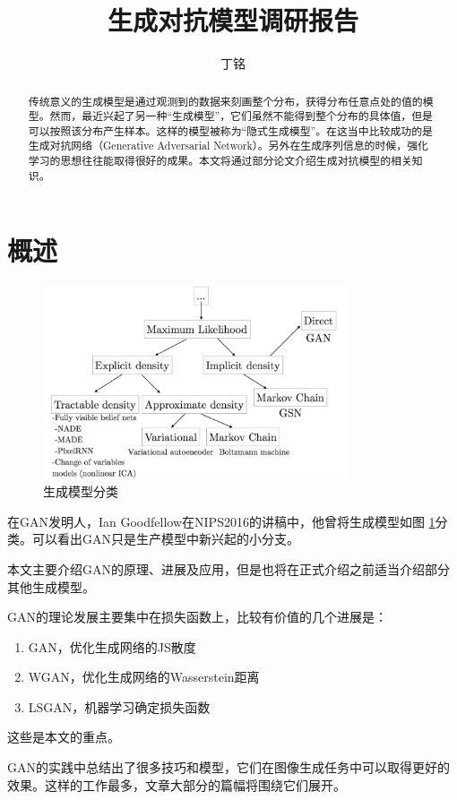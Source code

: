 \documentclass[a4paper]{article}
\title{生成对抗模型调研报告}
\author{丁铭}
\begin{document}
\maketitle

\begin{abstract}
传统意义的生成模型是通过观测到的数据来刻画整个分布，获得分布任意点处的值的模型。然而，最近兴起了另一种“生成模型”，它们虽然不能得到整个分布的具体值，但是可以按照该分布产生样本。这样的模型被称为“隐式生成模型”。在这当中比较成功的是生成对抗网络（Generative Adversarial Network）。另外在生成序列信息的时候，强化学习的思想往往能取得很好的成果。本文将通过部分论文介绍生成对抗模型的相关知识。
\end{abstract}
\tableofcontents
\newpage
\section{概述}
\begin{figure}\centering
\includegraphics[width=0.8\textwidth]{./img/1.png}
\caption{生成模型分类}
\label{fig:taxonomy}
\end{figure}
在GAN发明人，Ian Goodfellow在NIPS2016的讲稿\cite{gan_tutorial}中，他曾将生成模型如图 \ref{fig:taxonomy}分类。可以看出GAN只是生产模型中新兴起的小分支。

本文主要介绍GAN的原理、进展及应用，但是也将在正式介绍之前适当介绍部分其他生成模型。

GAN的理论发展主要集中在损失函数上，比较有价值的几个进展是：
\begin{enumerate}
\item GAN，优化生成网络的JS散度
\item WGAN，优化生成网络的Wasserstein距离
\item LSGAN，机器学习确定损失函数
\end{enumerate}这些是本文的重点。

GAN的实践中总结出了很多技巧和模型，它们在图像生成任务中可以取得更好的效果。这样的工作最多，文章大部分的篇幅将围绕它们展开。
\end{document}
